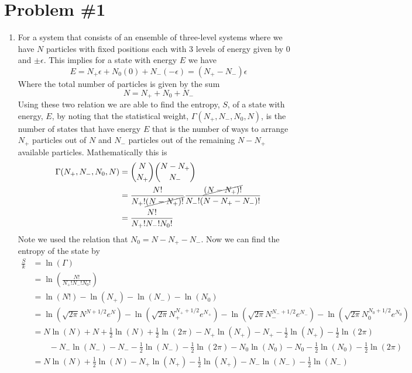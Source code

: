 \documentclass[11pt]{article}
\numberwithin{equation}{section}
\begin{document}


\section{Problem \#1}
\begin{enumerate}[(1)]
\item For a system that consists of an ensemble of three-level systems where we have $N$ 
particles with fixed positions each with 3 levels of energy given by $0$ and $\pm\epsilon$.
This implies for a state with energy $E$ we have 
$$E = N_{+}\epsilon + N_{0}(0) + N_{-}(-\epsilon) = (N_{+} -  N_{-})\epsilon$$
Where the total number of particles is given by the sum
$$N = N_{+} + N_{0} + N_{-}$$
Using these two relation we are able to find the entropy, $S$, of a state with energy, $E$, by 
noting that the statistical weight, $\Gamma(N_{+},N_{-},N_{0},N)$, is the number of states
that have energy $E$ that is the number of ways to arrange $N_{+}$ particles out of $N$ and 
$N_{-}$ particles out of the remaining $N-N_{+}$ available particles. Mathematically this is
\begin{align*}
\Gamma(N_{+},N_{-},N_{0},N) &= {{N}\choose{N_{+}}}{{N-N_{+}}\choose{N_{-}}} \\
&= \frac{N!}{N_{+}!\cancel{(N-N_{+})!}}\frac{\cancel{(N-N_+)!}}{N_{-}!(N-N_{+}-N_{-})!}\\
&= \frac{N!}{N_{+}!N_{-}!N_{0}!}
\end{align*}
Note we used the relation that $N_0=N-N_+-N_-$. Now we can find the entropy of the state by
\begin{align*}
\frac{S}{k} &= \ln\left(\Gamma\right)\\
&= \ln\left( \frac{N!}{N_{+}!N_{-}!N_{0}!}\right)\\
&= \ln(N!) - \ln(N_+) - \ln(N_-) - \ln(N_0)\\
&= \ln\left(\sqrt{2\pi}N^{N+1/2}e^{N}\right) - \ln\left(\sqrt{2\pi}N_+^{N_++1/2}e^{N_+}\right)- \ln\left(\sqrt{2\pi}N_-^{N_-+1/2}e^{N_-}\right)- \ln\left(\sqrt{2\pi}N_0^{N_0+1/2}e^{N_0}\right)\\
&= N\ln(N) + N + \frac{1}{2}\ln(N) + \frac{1}{2}\ln(2\pi) - N_+\ln(N_+) - N_+ - \frac{1}{2}\ln(N_+) - \frac{1}{2}\ln(2\pi) \\
&\qquad - N_-\ln(N_-) - N_- - \frac{1}{2}\ln(N_-) - \frac{1}{2}\ln(2\pi) - N_0\ln(N_0) - N_0 - \frac{1}{2}\ln(N_0) - \frac{1}{2}\ln(2\pi) \\
&= N\ln(N) + \frac{1}{2}\ln(N) - N_+\ln(N_+) - \frac{1}{2}\ln(N_+) - N_-\ln(N_-) - \frac{1}{2}\ln(N_-) \\

\end{align*}
\end{enumerate}
\end{document}
